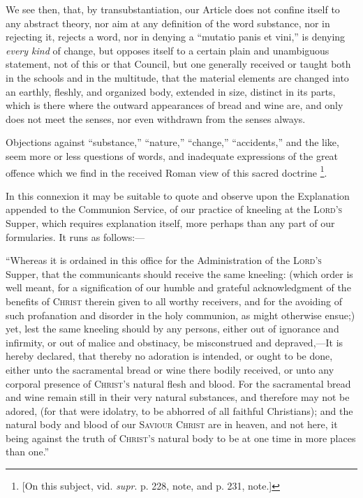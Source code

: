 We see then, that, by transubstantiation, our Article does not
confine itself to any abstract theory, nor aim at any definition of
the word substance, nor in rejecting it, rejects a word, nor in
denying a ``mutatio panis et vini,'' is denying \emph{every kind}
of change, but opposes itself to a certain plain and unambiguous
statement, not of this or that Council, but one generally received or
taught both in the schools and in the multitude, that the material
elements are changed into an earthly, fleshly, and organized body,
extended in size, distinct in its parts, which is there where the
outward appearances of bread and wine are, and only does not meet the
senses, nor even withdrawn from the senses always.

Objections against ``substance,'' ``nature,''
``change,'' ``accidents,'' and the like, seem more or
less questions of words, and inadequate expressions of the great
offence which we find in the received Roman view of this sacred
doctrine \footnote{[On this subject, vid. \emph{supr}. p. 228, note, and p. 231,
note.]}.

In this connexion it may be suitable to quote and observe upon the
Explanation appended to the Communion Service, of our practice of
kneeling at the L\textsc{ord's} Supper, which
requires explanation itself, more perhaps than any part of our
formularies. It runs as follows:—

``Whereas it is ordained in this office for the Administration
of the L\textsc{ord's} Supper, that the communicants
should receive the same kneeling: (which order is well meant, for a
signification of our humble and grateful acknowledgment of the
benefits of C\textsc{hrist} therein given to all worthy
receivers, and for the avoiding of such profanation and disorder in
the holy communion, as might otherwise ensue;) yet, lest the same
kneeling should by any persons, either out of ignorance and infirmity,
or out of malice and obstinacy, be misconstrued and depraved,—It is
hereby declared, that thereby no adoration is intended, or ought to be
done, either unto the sacramental bread or wine there bodily received,
or unto any corporal presence of C\textsc{hrist's}
natural flesh and blood. For the sacramental bread and wine remain
still in their very natural substances, and therefore may not be
adored, (for that were idolatry, to be abhorred of all faithful
Christians); and the natural body and blood of our S\textsc{aviour}
C\textsc{hrist} are in heaven, and not here, it being
against the truth of C\textsc{hrist's} natural body to be
at one time in more places than one.''

